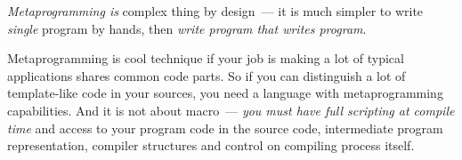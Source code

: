 
\begin{framed}
\emph{Metaprogramming is} complex thing by design\ --- it is much simpler to
write \textit{single} program by hands, then \emph{write program that writes
program}.
\end{framed}

\noindent
Metaprogramming is cool technique if your job is making a lot of typical
applications shares common code parts. So if you can distinguish a lot of
template-like code in your sources, you need a language with metaprogramming
capabilities. And it is not about macro\ --- \emph{you must have full scripting
at compile time} and access to your program code in the source code,
intermediate program representation, compiler structures and control on
compiling process itself.

